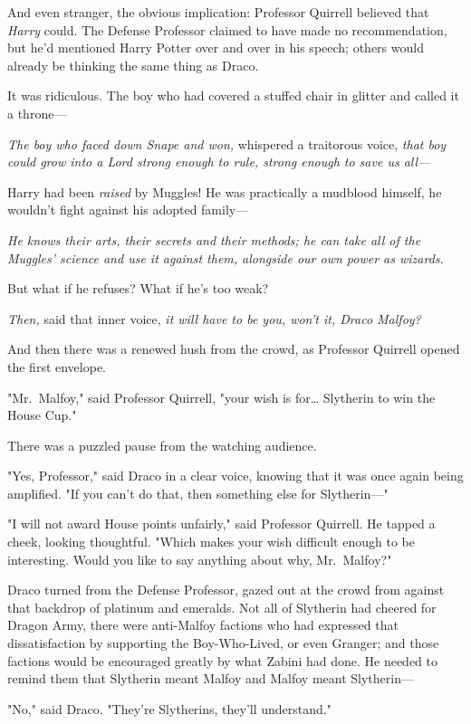 And even stranger, the obvious implication: Professor Quirrell believed that 
\emph{Harry} could. The Defense Professor claimed to have made no 
recommendation, but he'd mentioned Harry Potter over and over in his speech; 
others would already be thinking the same thing as Draco.

It was ridiculous. The boy who had covered a stuffed chair in glitter and 
called it a throne---

\emph{The boy who faced down Snape and won,} whispered a traitorous voice, 
\emph{that boy could grow into a Lord strong enough to rule, strong enough to 
save us all---}

Harry had been \emph{raised} by Muggles! He was practically a mudblood himself, 
he wouldn't fight against his adopted family---

\emph{He knows their arts, their secrets and their methods; he can take all of 
the Muggles' science and use it against them, alongside our own power as 
wizards.}

But what if he refuses? What if he's too weak?

\emph{Then,} said that inner voice, \emph{it will have to be you, won't it, 
Draco Malfoy?}

And then there was a renewed hush from the crowd, as Professor Quirrell opened 
the first envelope.

"Mr.~Malfoy," said Professor Quirrell, "your wish is for{\ldots} Slytherin to 
win the House Cup."

There was a puzzled pause from the watching audience.

"Yes, Professor," said Draco in a clear voice, knowing that it was once again 
being amplified. "If you can't do that, then something else for Slytherin---"

"I will not award House points unfairly," said Professor Quirrell. He tapped a 
cheek, looking thoughtful. "Which makes your wish difficult enough to be 
interesting. Would you like to say anything about why, Mr.~Malfoy?"

Draco turned from the Defense Professor, gazed out at the crowd from against 
that backdrop of platinum and emeralds. Not all of Slytherin had cheered for 
Dragon Army, there were anti-Malfoy factions who had expressed that 
dissatisfaction by supporting the Boy-Who-Lived, or even Granger; and those 
factions would be encouraged greatly by what Zabini had done. He needed to 
remind them that Slytherin meant Malfoy and Malfoy meant Slytherin---

"No," said Draco. "They're Slytherins, they'll understand."

